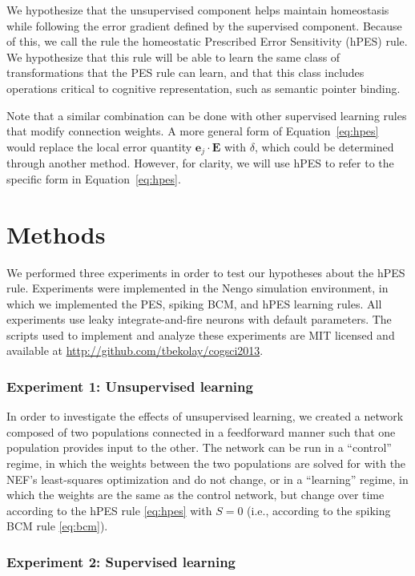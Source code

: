 \documentclass[10pt,letterpaper]{article}
\begin{document}
We hypothesize that the unsupervised
component helps maintain homeostasis
while following the error gradient defined
by the supervised component.
Because of this, we call the rule
the homeostatic Prescribed Error Sensitivity (hPES) rule.
We hypothesize that this rule will
be able to learn the same class
of transformations that the PES rule can learn,
and that this class includes operations
critical to cognitive representation,
such as semantic pointer binding.

Note that a similar combination can be done
with other supervised learning rules that
modify connection weights.
A more general form of Equation~\eqref{eq:hpes}
would replace the local error quantity
$\mathbf{e}_j \cdot \mathbf{E}$ with $\delta$,
which could be determined through another method.
However, for clarity, we will use hPES
to refer to the specific form in
Equation~\eqref{eq:hpes}.

\section{Methods}

We performed three experiments in order to
test our hypotheses about the hPES rule.
Experiments were implemented in the Nengo
simulation environment, in which we implemented
the PES, spiking BCM, and hPES learning rules.
All experiments use leaky integrate-and-fire
neurons with default parameters.
The scripts used to implement
and analyze these experiments
are MIT licensed and available at
\url{http://github.com/tbekolay/cogsci2013}.

\subsubsection{Experiment 1: Unsupervised learning}

In order to investigate the effects
of unsupervised learning,
we created a network composed of two populations
connected in a feedforward manner
such that one population provides input to the other.
The network can be run in a ``control'' regime,
in which the weights between the two populations
are solved for with the NEF's least-squares optimization
and do not change, or in a ``learning'' regime,
in which the weights are the same as the control network,
but change over time according to the hPES rule \eqref{eq:hpes}
with $S = 0$ (i.e., according to the spiking BCM rule \eqref{eq:bcm}).

\subsubsection{Experiment 2: Supervised learning}
\end{document}
